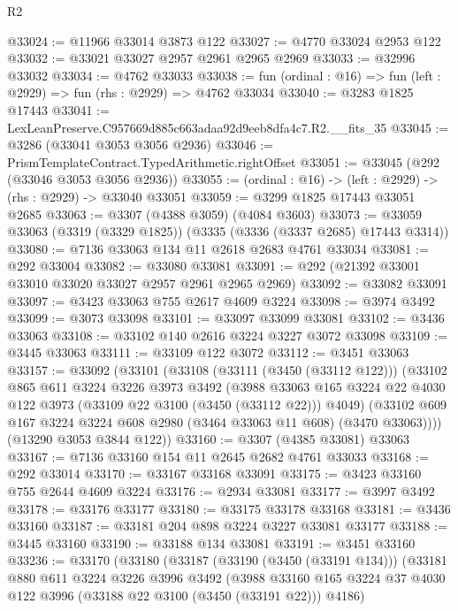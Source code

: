 \begin{lexlean}{R2}
\begin{coremodule}
@33024 := @11966 @33014 @3873 @122
@33027 := @4770 @33024 @2953 @122
@33032 := @33021 @33027 @2957 @2961 @2965 @2969
@33033 := @32996 @33032
@33034 := @4762 @33033
@33038 := fun (ordinal : @16) => fun (left : @2929) => fun (rhs : @2929) => @4762 @33034
@33040 := @3283 @1825 @17443
@33041 := LexLeanPreserve.C957669d885c663adaa92d9eeb8dfa4c7.R2.__fits_35
@33045 := @3286 (@33041 @3053 @3056 @2936)
@33046 := PrismTemplateContract.TypedArithmetic.rightOffset
@33051 := @33045 (@292 (@33046 @3053 @3056 @2936))
@33055 := (ordinal : @16) -> (left : @2929) -> (rhs : @2929) -> @33040 @33051
@33059 := @3299 @1825 @17443 @33051 @2685
@33063 := @3307 (@4388 @3059) (@4084 @3603)
@33073 := @33059 @33063 (@3319 (@3329 @1825)) (@3335 (@3336 (@3337 @2685) @17443 @3314))
@33080 := @7136 @33063 @134 @11 @2618 @2683 @4761 @33034
@33081 := @292 @33004
@33082 := @33080 @33081
@33091 := @292 (@21392 @33001 @33010 @33020 @33027 @2957 @2961 @2965 @2969)
@33092 := @33082 @33091
@33097 := @3423 @33063 @755 @2617 @4609 @3224
@33098 := @3974 @3492
@33099 := @3073 @33098
@33101 := @33097 @33099 @33081
@33102 := @3436 @33063
@33108 := @33102 @140 @2616 @3224 @3227 @3072 @33098
@33109 := @3445 @33063
@33111 := @33109 @122 @3072
@33112 := @3451 @33063
@33157 := @33092
    (@33101
      (@33108
        (@33111 (@3450 (@33112 @122)))
        (@33102
          @865
          @611
          @3224
          @3226
          @3973
          @3492
          (@3988
            @33063
            @165
            @3224
            @22
            @4030
            @122
            @3973
            (@33109 @22 @3100 (@3450 (@33112 @22)))
            @4049)
          (@33102 @609 @167 @3224 @3224 @608 @2980 (@3464 @33063 @11 @608) (@3470 @33063))))
      (@13290 @3053 @3844 @122))
@33160 := @3307 (@4385 @33081) @33063
@33167 := @7136 @33160 @154 @11 @2645 @2682 @4761 @33033
@33168 := @292 @33014
@33170 := @33167 @33168 @33091
@33175 := @3423 @33160 @755 @2644 @4609 @3224
@33176 := @2934 @33081
@33177 := @3997 @3492
@33178 := @33176 @33177
@33180 := @33175 @33178 @33168
@33181 := @3436 @33160
@33187 := @33181 @204 @898 @3224 @3227 @33081 @33177
@33188 := @3445 @33160
@33190 := @33188 @134 @33081
@33191 := @3451 @33160
@33236 := @33170
    (@33180
      (@33187
        (@33190 (@3450 (@33191 @134)))
        (@33181
          @880
          @611
          @3224
          @3226
          @3996
          @3492
          (@3988
            @33160
            @165
            @3224
            @37
            @4030
            @122
            @3996
            (@33188 @22 @3100 (@3450 (@33191 @22)))
            @4186)

\end{coremodule}
\end{lexlean}
